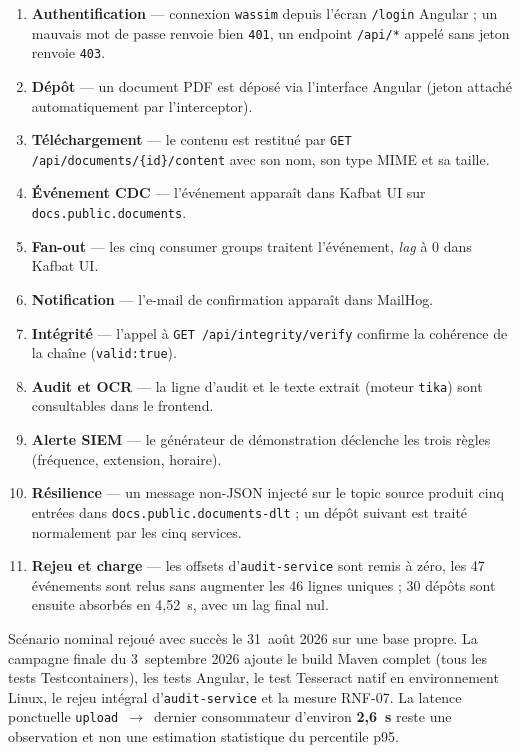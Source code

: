 \documentclass[12pt,a4paper,openany]{report}
\begin{document}
    \begin{enumerate}
      \item \textbf{Authentification} --- connexion \texttt{wassim} depuis l'\'ecran \texttt{/login} Angular ; un mauvais mot de passe renvoie bien \texttt{401}, un endpoint \texttt{/api/*} appel\'e sans jeton renvoie \texttt{403}.
      \item \textbf{D\'ep\^ot} --- un document PDF est d\'epos\'e via l'interface Angular (jeton attach\'e automatiquement par l'interceptor).
      \item \textbf{T\'el\'echargement} --- le contenu est restitu\'e par \texttt{GET /api/documents/\{id\}/content} avec son nom, son type MIME et sa taille.
      \item \textbf{\'Ev\'enement CDC} --- l'\'ev\'enement appara\^it dans Kafbat UI sur \texttt{docs.public.documents}.
      \item \textbf{Fan-out} --- les cinq consumer groups traitent l'\'ev\'enement, \emph{lag} \`a 0 dans Kafbat UI.
      \item \textbf{Notification} --- l'e-mail de confirmation appara\^it dans MailHog.
      \item \textbf{Int\'egrit\'e} --- l'appel \`a \texttt{GET /api/integrity/verify} confirme la coh\'erence de la cha\^ine (\texttt{valid:true}).
      \item \textbf{Audit et OCR} --- la ligne d'audit et le texte extrait (moteur \texttt{tika}) sont consultables dans le frontend.
      \item \textbf{Alerte SIEM} --- le g\'en\'erateur de d\'emonstration d\'eclenche les trois r\`egles (fr\'equence, extension, horaire).
      \item \textbf{R\'esilience} --- un message non-JSON inject\'e sur le topic source produit cinq entr\'ees dans \texttt{docs.public.documents-dlt} ; un d\'ep\^ot suivant est trait\'e normalement par les cinq services.
      \item \textbf{Rejeu et charge} --- les offsets d'\texttt{audit-service} sont remis \`a z\'ero, les 47 \'ev\'enements sont relus sans augmenter les 46 lignes uniques ; 30 d\'ep\^ots sont ensuite absorb\'es en 4,52~s, avec un lag final nul.
    \end{enumerate}

    \begin{donebox}
    Sc\'enario nominal rejou\'e avec succ\`es le 31~ao\^ut 2026 sur une base propre. La campagne finale du 3~septembre 2026 ajoute le build Maven complet (tous les tests Testcontainers), les tests Angular, le test Tesseract natif en environnement Linux, le rejeu int\'egral d'\texttt{audit-service} et la mesure RNF-07. La latence ponctuelle \texttt{upload}~$\rightarrow$~dernier consommateur d'environ \textbf{2,6~s} reste une observation et non une estimation statistique du percentile p95.
    \end{donebox}
\end{document}
